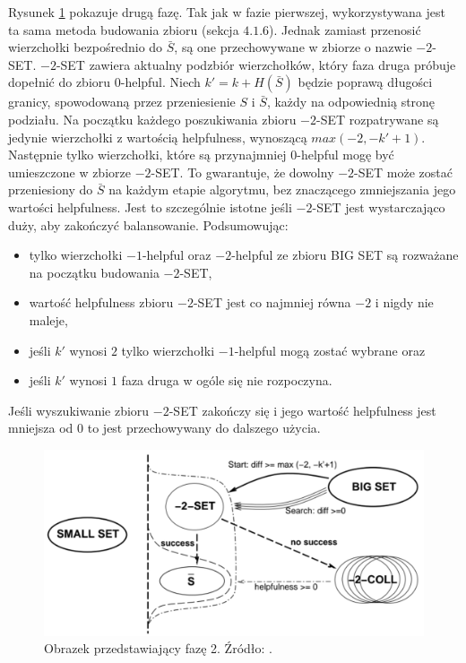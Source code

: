 Rysunek \ref{im:phase_2} pokazuje drugą fazę.
Tak jak w fazie pierwszej, wykorzystywana jest ta sama metoda budowania zbioru (sekcja $4.1.6$).
Jednak zamiast przenosić wierzchołki bezpośrednio do $\bar{S}$, są one przechowywane w zbiorze o nazwie $-2$-SET.
$-2$-SET zawiera aktualny podzbiór wierzchołków, który faza druga próbuje dopełnić do zbioru $0$-helpful.
Niech $k' = k + H(\bar{S})$ będzie poprawą długości granicy, spowodowaną przez przeniesienie $S$ i $\bar{S}$, każdy
na odpowiednią stronę podziału.
Na początku każdego poszukiwania zbioru $-2$-SET rozpatrywane są jedynie wierzchołki z wartością helpfulness, wynoszącą
$max(-2, -k'+1)$.
Następnie tylko wierzchołki, które są przynajmniej $0$-helpful mogę być umieszczone w zbiorze $-2$-SET.
To gwarantuje, że dowolny $-2$-SET może zostać przeniesiony do $\bar{S}$ na każdym etapie algorytmu, bez znaczącego
zmniejszania jego wartości helpfulness.
Jest to szczególnie istotne jeśli $-2$-SET jest wystarczająco duży, aby zakończyć balansowanie.
Podsumowując:
\begin{itemize}
    \item {tylko wierzchołki $-1$-helpful oraz $-2$-helpful ze zbioru BIG SET są rozważane na początku budowania $-2$-SET,}
    \item wartość helpfulness zbioru $-2$-SET jest co najmniej równa $-2$ i nigdy nie maleje,
    \item jeśli $k'$ wynosi $2$ tylko wierzchołki $-1$-helpful mogą zostać wybrane oraz
    \item jeśli $k'$ wynosi $1$ faza druga w ogóle się nie rozpoczyna.
\end{itemize}

Jeśli wyszukiwanie zbioru $-2$-SET zakończy się i jego wartość helpfulness jest mniejsza od $0$ to jest przechowywany
do dalszego użycia.
\begin{figure}[h]
    \centering
    \includegraphics[width=0.65\linewidth]{images/phase2}
    \caption{Obrazek przedstawiający fazę 2. Źródło: \cite{article}.}
    \label{im:phase_2}
\end{figure}
\newpage

